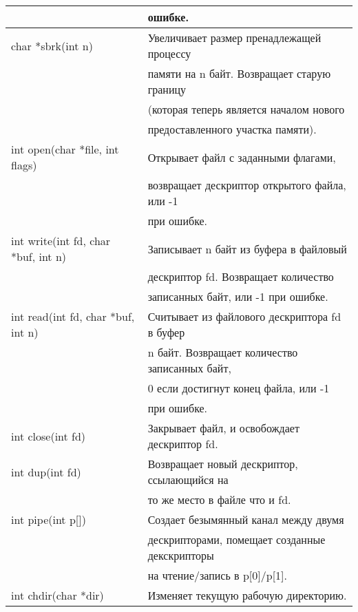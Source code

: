 \begin{longtable}[c]{l|l}
                                        & ошибке. \\
\hline
char *sbrk(int n)                       & Увеличивает размер пренадлежащей процессу \\
                                        & памяти на n байт. Возвращает старую границу \\
                                        & (которая теперь является началом нового \\
                                        & предоставленного участка памяти). \\
\hline
int open(char *file, int flags)         & Открывает файл с заданными флагами, \\
                                        & возвращает дескриптор открытого файла, или -1 \\
                                        & при ошибке. \\
\hline
int write(int fd, char *buf, int n)     & Записывает n байт из буфера в файловый \\
                                        & дескриптор fd. Возвращает количество \\
                                        & записанных байт, или -1 при ошибке. \\
\hline
int read(int fd, char *buf, int n)    & Считывает из файлового дескриптора fd в буфер \\
                                      & n байт. Возвращает количество записанных байт, \\
                                      & 0 если достигнут конец файла, или -1 \\
                                      & при ошибке. \\
\hline
int close(int fd)                     & Закрывает файл, и освобождает дескриптор fd. \\
\hline
int dup(int fd)                       & Возвращает новый дескриптор, ссылающийся на \\
                                      & то же место в файле что и fd.\\
\hline
int pipe(int p[])                     & Создает безымянный канал между двумя \\
                                      & дескрипторами, помещает созданные декскрипторы \\
                                      & на чтение/запись в p[0]/p[1]. \\
\hline
int chdir(char *dir)                  & Изменяет текущую рабочую директорию. \\

\end{longtable}
